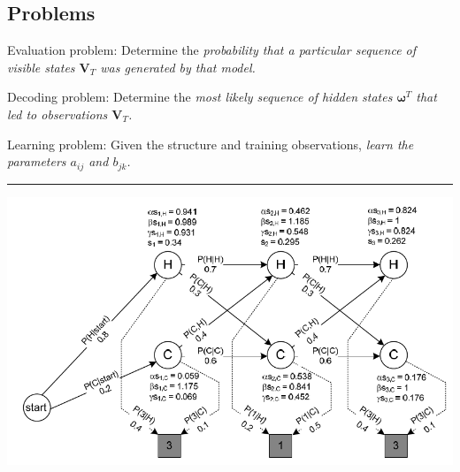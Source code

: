 \begin{minipage}{0.3\textwidth}
  \subsection{Problems}
    \begin{liste}
      \item Evaluation problem: Determine the \em probability \em that a particular sequence of 
      visible states $\bm V_T$ was generated by \em that model\em.
      \item Decoding problem: Determine the \em most likely sequence of hidden states \em $\bm \omega^T$ that
      led to observations $\bm V_T$.
      \item Learning problem: Given the structure and training observations, \em learn the parameters \em
      $a_{ij}$ and $b_{jk}$. 
    \end{liste}
\end{minipage}
\vspace{5mm}
\hrule
\vspace{5mm}
\begin{minipage}{0.55\textwidth}
	\includegraphics[width=1\linewidth]{./Content/Markov/hmm.png}
\end{minipage}
